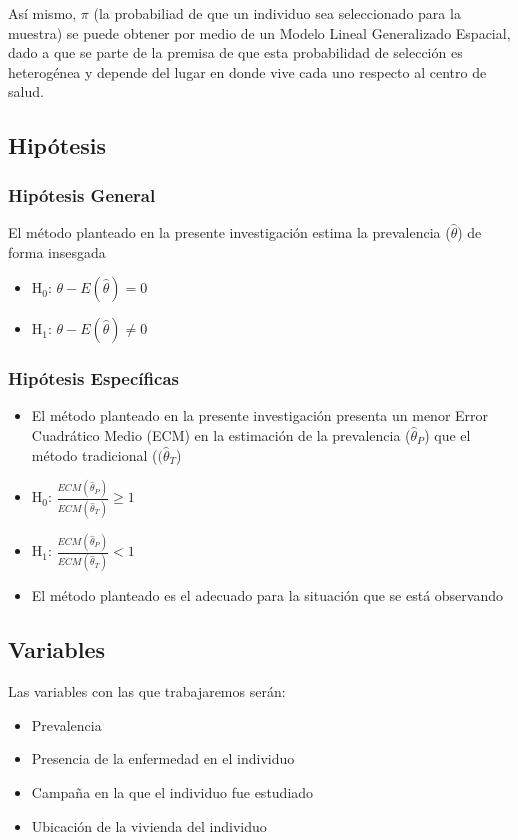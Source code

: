 Así mismo, $\pi$ (la probabiliad de que un individuo sea seleccionado para la muestra) se puede obtener por medio de un Modelo Lineal Generalizado Espacial, dado a que se parte de la premisa de que esta probabilidad de selección es heterogénea y depende del lugar en donde vive cada uno respecto al centro de salud.

\newpage
\subsection{Hipótesis}
\subsubsection{Hipótesis General}
El método planteado en la presente investigación estima la prevalencia ($\hat{\theta}$) de forma insesgada
\begin{itemize}
    \item[] H$_0$: $\theta - E (\hat{\theta}) = 0$
    \item[] H$_1$: $\theta - E (\hat{\theta}) \neq 0$
\end{itemize}

\subsubsection{Hipótesis Específicas}
\begin{itemize}
    \item El método planteado en la presente investigación presenta un menor Error Cuadrático Medio (ECM) en la estimación de la prevalencia ($\hat{\theta}_P$) que el método tradicional ($(\hat{\theta}_T$)
\end{itemize}

\begin{itemize}
    \item[] H$_0$: $\frac{ECM(\hat{\theta}_P)}{ECM(\hat{\theta}_T)} \geq 1$
    \item[] H$_1$: $\frac{ECM(\hat{\theta}_P)}{ECM(\hat{\theta}_T)} < 1$
\end{itemize}

\begin{itemize}    
    \item El método planteado es el adecuado para la situación que se está observando
\end{itemize}

\subsection{Variables}
Las variables con las que trabajaremos serán:
\begin{itemize}
    \item Prevalencia
    \item Presencia de la enfermedad en el individuo
    \item Campaña en la que el individuo fue estudiado
    \item Ubicación de la vivienda del individuo
\end{itemize}
